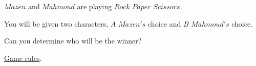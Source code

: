$Mazen$ and $Mahmoud$ are playing $Rock$ $Paper$ $Scissors$.

You will be given two characters, $A$ $Mazen's$ choice and $B$ $Mahmoud's$ choice.

Can you determine who will be the winner?

\href{https://wrpsa.com/the-official-rules-of-rock-paper-scissors/}{Game rules}.